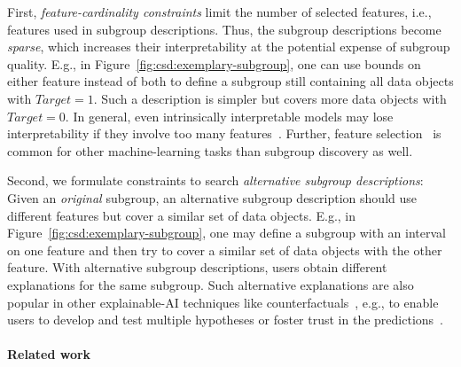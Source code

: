 \documentclass{article}
\theoremstyle{definition}
\begin{document}
First, \emph{feature-cardinality constraints} limit the number of selected features, i.e., features used in subgroup descriptions.
Thus, the subgroup descriptions become \emph{sparse}, which increases their interpretability at the potential expense of subgroup quality.
E.g., in Figure~\ref{fig:csd:exemplary-subgroup}, one can use bounds on either feature instead of both to define a subgroup still containing all data objects with $\mathit{Target} = 1$.
Such a description is simpler but covers more data objects with $\mathit{Target} = 0$.
In general, even intrinsically interpretable models may lose interpretability if they involve too many features~\cite{meeng2021real, molnar2020interpretable}.
Further, feature selection~\cite{guyon2003introduction, li2017feature} is common for other machine-learning tasks than subgroup discovery as well.

Second, we formulate constraints to search \emph{alternative subgroup descriptions}:
Given an \emph{original} subgroup, an alternative subgroup description should use different features but cover a similar set of data objects.
E.g., in Figure~\ref{fig:csd:exemplary-subgroup}, one may define a subgroup with an interval on one feature and then try to cover a similar set of data objects with the other feature.
With alternative subgroup descriptions, users obtain different explanations for the same subgroup.
Such alternative explanations are also popular in other explainable-AI techniques like counterfactuals~\cite{mothilal2020explaining, russell2019efficient}, e.g., to enable users to develop and test multiple hypotheses or foster trust in the predictions~\cite{kim2021multi, wang2019designing}.

\paragraph{Related work}
\end{document}
